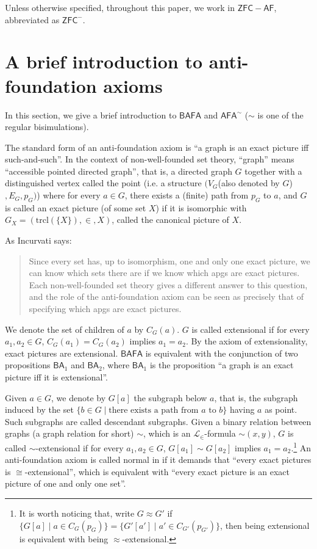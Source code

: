 \documentclass{amsart}
\newcommand{\ZFC}{\mathsf{ZFC}}
\newcommand{\AF}{\mathsf{AF}}
\newcommand{\BAFA}{\mathsf{BAFA}}
\newcommand{\AFA}{\mathsf{AFA}}
\newcommand{\trcl}{\text{trcl}}
\begin{document}
Unless otherwise specified, throughout this paper, we work in $\ZFC-\AF$, abbreviated as $\ZFC^-$.

\section{A brief introduction to anti-foundation axioms}

In this section, we give a brief introduction to $\BAFA$ and $\AFA^\sim$ ($\sim$ is one of the regular bisimulations).

The standard form of an anti-foundation axiom is ``a graph is an exact picture iff such-and-such''. In the context of non-well-founded set theory, ``graph'' means ``accessible pointed directed graph'', that is, a directed graph $G$ together with a distinguished vertex called the point (i.e. a structure $(V_G$(also denoted by $G$)$,E_G,p_G)$) where for every $a \in G$, there exists a (finite) path from $p_G$ to $a$, and $G$ is called an exact picture (of some set $X$) if it is isomorphic with $G_X = (\trcl(\{X\}), \in, X)$, called the canonical picture of $X$.

As Incurvati says:
\begin{quote}
Since every set has, up to isomorphism, one and only one exact picture, we can know which sets there are if we know which apgs are exact pictures. Each non-well-founded set theory gives a different answer to this question, and the role of the anti-foundation axiom can be seen as precisely that of specifying which apgs are exact pictures.\cite{Incurvati}
\end{quote}

We denote the set of children of $a$ by $C_G(a)$. $G$ is called extensional if for every $a_1,a_2 \in G$, $C_G(a_1) = C_G(a_2)$ implies $a_1 = a_2$. By the axiom of extensionality, exact pictures are extensional. $\BAFA$ is equivalent with the conjunction of two propositions $\mathsf{BA}_1$ and $\mathsf{BA}_2$, where $\mathsf{BA}_1$ is the proposition ``a graph is an exact picture iff it is extensional''.

Given $a \in G$, we denote by $G[a]$ the subgraph below $a$, that is, the subgraph induced by the set $\{ b \in G \mid \text{there exists a path from } a \text{ to } b \}$ having $a$ as point. Such subgraphs are called descendant subgraphs. Given a binary relation between graphs (a graph relation for short) $\sim$, which is an $\mathcal{L}_\in$-formula $\sim(x,y)$, $G$ is called $\sim$-extensional if for every $a_1,a_2 \in G$, $G[a_1] \sim G[a_2]$ implies $a_1 = a_2$.\footnote{It is worth noticing that, write $G\approx G'$ if $\{G[a]\mid a\in C_G(p_G)\}=\{G'[a']\mid a'\in C_{G'}(p_{G'})\}$, then being extensional is equivalent with being $\approx$-extensional.} An anti-foundation axiom is called normal in \cite{Ju} if it demands that ``every exact pictures is $\cong$-extensional'', which is equivalent with ``every exact picture is an exact picture of one and only one set''.
\end{document}
